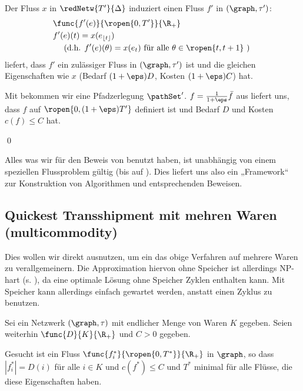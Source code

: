 \begin{standaloneProof}
    Der Fluss $x$ in $\redNetw{T'}{\Delta}$ induziert einen Fluss $f'$ in
    $(\graph, \tau')$:
    \begin{align*}
        & \func{f'(e)}{\ropen{0,T'}}{\R_+} \\
        & f'(e)(t) = x(e_{\lfloor t \rfloor}) \\
        & \quad \text{ (d.h. } f'(e)(\theta) = x(e_t)
            \text{ für alle } \theta \in \ropen{t, t+1} \text{ ) }
    \end{align*}
     liefert, dass $f'$ ein zulässiger Fluss in
    $(\graph, \tau')$ ist und die gleichen Eigenschaften wie $x$
    (Bedarf $(1+\eps)D$, Kosten $(1+\eps)C$) hat.
    
    Mit  bekommen wir eine Pfadzerlegung $\pathSet'$.
    $f = \frac{1}{1+\eps} \bar{f}$ aus  liefert uns, dass
    $f$ auf $\ropen{0, (1 + \eps)T'}$ definiert ist und Bedarf $D$ und Kosten
    $c(f) \leq C$ hat.
    \begin{flushright}\qed \end{flushright}
\end{standaloneProof}

\begin{remark}
    Alles was wir für den Beweis von  benutzt haben, ist
    unabhängig von einem speziellen Flussproblem gültig
    (bis auf ). Dies liefert uns also ein „Framework“
    zur Konstruktion von Algorithmen und entsprechenden Beweisen.
\end{remark}

\subsection*{Quickest Transshipment mit mehren Waren (multicommodity)}
Dies wollen wir direkt ausnutzen, um ein das obige Verfahren auf mehrere
Waren zu verallgemeinern. Die Approximation hiervon ohne Speicher ist allerdings
NP-hart (s. \cite{fleischerSiam}), da eine optimale Lösung ohne Speicher
Zyklen enthalten kann. Mit Speicher kann allerdings einfach gewartet werden,
anstatt einen Zyklus zu benutzen.

\begin{problem}
\label{prob:qtp_multi}
    Sei ein Netzwerk $(\graph, \tau)$ mit endlicher Menge von Waren $K$ gegeben.
    Seien weiterhin $\func{D}{K}{\R_+}$ und $C > 0$ gegeben.

    Gesucht ist ein Fluss $\func{f_i^*}{\ropen{0,T^*}}{\R_+}$ in $\graph$,
    so dass $|f_i^*| = D(i)$ für alle $i \in K$ und
    $c(f^*) \leq C$ und $T^*$ minimal für alle Flüsse,
    die diese Eigenschaften haben.
\end{problem}

